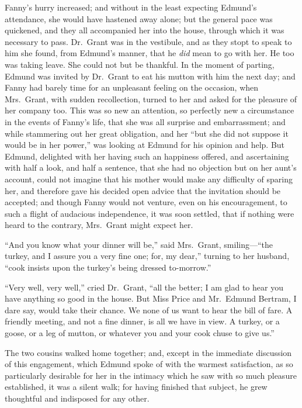 Fanny's hurry increased; and without in the least expecting
Edmund's attendance, she would have hastened away alone;
but the general pace was quickened, and they all accompanied
her into the house, through which it was necessary to pass.
Dr.\ Grant was in the vestibule, and as they stopt to
speak to him she found, from Edmund's manner, that he
\emph{did} mean to go with her.  He too was taking leave.
She could not but be thankful.  In the moment of parting,
Edmund was invited by Dr.\ Grant to eat his mutton
with him the next day; and Fanny had barely time for an
unpleasant feeling on the occasion, when Mrs.\ Grant,
with sudden recollection, turned to her and asked for the
pleasure of her company too.  This was so new an attention,
so perfectly new a circumstance in the events of
Fanny's life, that she was all surprise and embarrassment;
and while stammering out her great obligation, and her
``but she did not suppose it would be in her power,''
was looking at Edmund for his opinion and help.  But Edmund,
delighted with her having such an happiness offered,
and ascertaining with half a look, and half a sentence,
that she had no objection but on her aunt's account,
could not imagine that his mother would make any difficulty
of sparing her, and therefore gave his decided open advice
that the invitation should be accepted; and though Fanny
would not venture, even on his encouragement, to such
a flight of audacious independence, it was soon settled,
that if nothing were heard to the contrary, Mrs.\ Grant
might expect her.

``And you know what your dinner will be,''
said Mrs.\ Grant, smiling---``the turkey, and I assure you
a very fine one; for, my dear,'' turning to her husband,
``cook insists upon the turkey's being dressed to-morrow.''

``Very well, very well,'' cried Dr.\ Grant, ``all the better;
I am glad to hear you have anything so good in the house.
But Miss Price and Mr.\ Edmund Bertram, I dare say, would take
their chance.  We none of us want to hear the bill of fare.
A friendly meeting, and not a fine dinner, is all we
have in view.  A turkey, or a goose, or a leg of mutton,
or whatever you and your cook chuse to give us.''

The two cousins walked home together; and, except in the
immediate discussion of this engagement, which Edmund
spoke of with the warmest satisfaction, as so particularly
desirable for her in the intimacy which he saw with
so much pleasure established, it was a silent walk;
for having finished that subject, he grew thoughtful
and indisposed for any other.



